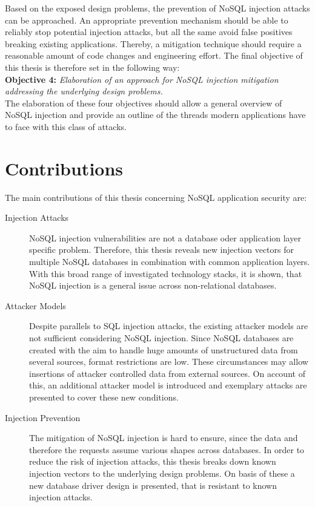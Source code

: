 Based on the exposed design problems, the prevention of NoSQL injection attacks can be approached. An appropriate prevention mechanism should be able to reliably stop potential injection attacks, but all the same avoid false positives breaking existing applications. Thereby, a mitigation technique should require a reasonable amount of code changes and engineering effort. The final objective of this thesis is therefore set in the following way:\\

\textbf{Objective 4:} \textit{Elaboration of an approach for NoSQL injection mitigation addressing the underlying design problems.} \\

The elaboration of these four objectives should allow a general overview of NoSQL injection and provide an outline of the threads modern applications have to face with this class of attacks. \\


\section{Contributions}

The main contributions of this thesis concerning NoSQL application security are:
\begin{description}
\item [Injection Attacks] NoSQL injection vulnerabilities are not a database oder application layer specific problem. Therefore, this thesis reveals new injection vectors for multiple NoSQL databases in combination with common application layers. With this broad range of investigated technology stacks, it is shown, that NoSQL injection is a general issue across non-relational databases.
\item [Attacker Models] Despite parallels to SQL injection attacks, the existing attacker models are not sufficient considering NoSQL injection. Since NoSQL databases are created with the aim to handle huge amounts of unstructured data from several sources, format restrictions are low. These circumstances may allow insertions of attacker controlled data from external sources. On account of this, an additional attacker model is introduced and exemplary attacks are presented to cover these new conditions.
\item [Injection Prevention] The mitigation of NoSQL injection is hard to ensure, since the data and therefore the requests assume various shapes across databases. In order to reduce the risk of injection attacks, this thesis breaks down known injection vectors to the underlying design problems. On basis of these a new database driver design is presented, that is resistant to known injection attacks.
\end{description}


